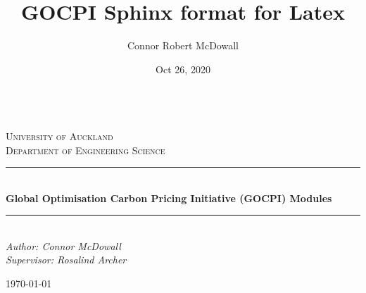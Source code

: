 \documentclass[a4paper,12pt,english]{article}
\title{GOCPI Sphinx format for Latex }
\date{Oct 26, 2020}
\author{Connor Robert McDowall}
\begin{document}
\pagestyle{empty}


        \begin{titlepage}
        \newcommand{\HRule}{\rule{\linewidth}{0.5mm}} %
        
        \center
        
        
        \textsc{\LARGE }\\[1.5cm] %
        
        \textsc{\Large University of Auckland\\Department of Engineering Science}\\[0.5cm] %
        
        
        \HRule\\[0.5cm]
        
        {\huge\bfseries Global Optimisation Carbon Pricing Initiative (GOCPI) Modules}\\[0.4cm] %
        
        \HRule\\[0.5cm]
        
        
        {\large\textit{Author: Connor McDowall \\Supervisor: Rosalind Archer}}\\
        
        
        \vfill\vfill\vfill %
        
        {\large\today} %
        
        
        \vfill %
        
    \end{titlepage}
\end{document}
